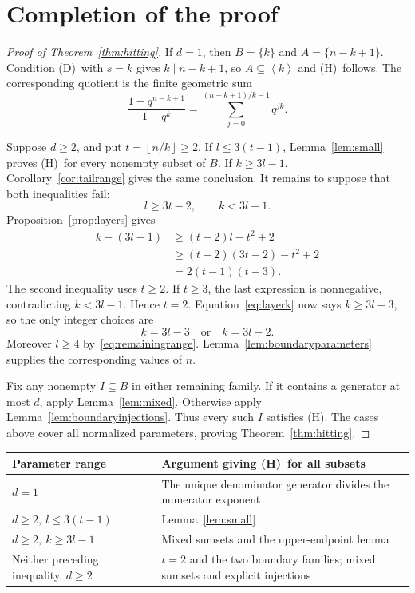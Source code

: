 \documentclass[11pt,a4paper]{article}
\numberwithin{equation}{section}
\theoremstyle{remark}
\newcommand{\sg}[1]{\left\langle #1\right\rangle}
\newcommand{\floor}[1]{\left\lfloor #1\right\rfloor}
\newcommand{\Dcond}{\textup{(D)}}
\newcommand{\Hcond}{\textup{(H)}}
\begin{document}
\section{Completion of the proof}\label{sec:completion}

\begin{proof}[Proof of Theorem~\ref{thm:hitting}]
If $d=1$, then $B=\{k\}$ and $A=\{n-k+1\}$.
Condition \Dcond\ with $s=k$ gives $k\mid n-k+1$, so
$A\subseteq\sg{k}$ and \Hcond\ follows.
The corresponding quotient is the finite geometric sum
\[
  \frac{1-q^{n-k+1}}{1-q^k}
  =\sum_{j=0}^{(n-k+1)/k-1}q^{jk}.
\]

Suppose $d\ge2$, and put $t=\floor{n/k}\ge2$.
If $l\le3(t-1)$, Lemma~\ref{lem:small} proves \Hcond\ for every
nonempty subset of $B$.
If $k\ge3l-1$, Corollary~\ref{cor:tailrange} gives the same conclusion.
It remains to suppose that both inequalities fail:
\begin{equation}\label{eq:remainingrange}
  l\ge3t-2,\qquad k<3l-1.
\end{equation}
Proposition~\ref{prop:layers} gives
\begin{equation}\label{eq:completiondifference}
  \begin{split}
  k-(3l-1)
  &\ge (t-2)l-t^2+2\\
  &\ge (t-2)(3t-2)-t^2+2\\
  &=2(t-1)(t-3).
  \end{split}
\end{equation}
The second inequality uses $t\ge2$.
If $t\ge3$, the last expression is nonnegative, contradicting
$k<3l-1$. Hence $t=2$.
Equation~\eqref{eq:layerk} now says $k\ge3l-3$, so the only
integer choices are
\begin{equation}\label{eq:onlyboundaries}
  k=3l-3\quad\text{or}\quad k=3l-2.
\end{equation}
Moreover $l\ge4$ by~\eqref{eq:remainingrange}.
Lemma~\ref{lem:boundaryparameters} supplies the corresponding values
of $n$.

Fix any nonempty $I\subseteq B$ in either remaining family.
If it contains a generator at most $d$, apply Lemma~\ref{lem:mixed}.
Otherwise apply Lemma~\ref{lem:boundaryinjections}.
Thus every such $I$ satisfies \Hcond.
The cases above cover all normalized parameters, proving
Theorem~\ref{thm:hitting}.
\end{proof}

\begin{center}
\small
\begin{tabularx}{\textwidth}{@{}p{}X@{}}
\toprule
\textbf{Parameter range} & \textbf{Argument giving \Hcond\ for all subsets}\\
\midrule
$d=1$ & The unique denominator generator divides the numerator exponent\\
$d\ge2,\ l\le3(t-1)$ & Lemma~\ref{lem:small}\\
$d\ge2,\ k\ge3l-1$ & Mixed sumsets and the upper-endpoint lemma\\
Neither preceding inequality, $d\ge2$ &
$t=2$ and the two boundary families;
mixed sumsets and explicit injections\\
\bottomrule
\end{tabularx}
\end{center}
\end{document}
